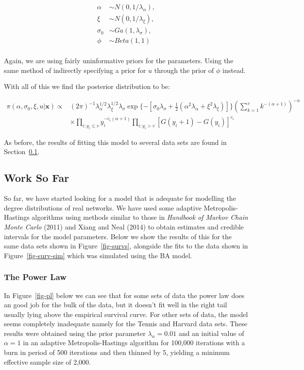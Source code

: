 \documentclass[
]{article}
\begin{document}
\begin{align*}
\alpha &\sim N(0,1/\lambda_\alpha),\\
\xi &\sim N(0,1/\lambda_\xi),\\
\sigma_0 &\sim Ga(1,\lambda_\sigma),\\
\phi &\sim Beta(1,1)\\
%
\end{align*}

Again, we are using fairly uninformative priors for the parameters.
Using the same method of indirectly specifying a prior for \(u\) through
the prior of \(\phi\) instead.

With all of this we find the posterior distribution to be:

\begin{align*}
\pi(\alpha,\sigma_0, \xi, u| \boldsymbol{x}) \propto & (2\pi)^{-1}\lambda_\alpha^{1/2}\lambda_\xi^{1/2}\lambda_\sigma\exp\{-[\sigma_0\lambda_\sigma + \frac{1}{2}(\alpha^2\lambda_\alpha + \xi^2\lambda_\xi)]\} \left(\sum_{k=1}^v k^{-(\alpha+1)}\right)^{-n}\\& \times \prod_{i:y_i\le v}y_i^{-c_i(\alpha+1)}\prod_{i:y_i>v}\left[G(y_i+1) - G(y_i)\right]^{c_i}
\end{align*}

As before, the results of fitting this model to several data sets are
found in Section~\ref{sec-wsf}.

\subsection{Work So Far}\label{sec-wsf}

So far, we have started looking for a model that is adequate for
modelling the degree distributions of real networks. We have used some
adaptive Metropolis-Hastings algorithms using methods similar to those
in \emph{Handbook of Markov Chain Monte Carlo} (2011) and Xiang and Neal
(2014) to obtain estimates and credible intervals for the model
parameters. Below we show the results of this for the same data sets
shown in Figure~\ref{fig-survs}, alongside the fits to the data shown in
Figure~\ref{fig-surv-sim} which was simulated using the BA model.

\subsubsection{The Power Law}\label{the-power-law}

In Figure~\ref{fig-pl} below we can see that for some sets of data the
power law does an good job for the bulk of the data, but it doesn't fit
well in the right tail usually lying above the empirical survival curve.
For other sets of data, the model seems completely inadequate namely for
the Tennis and Harvard data sets. These results were obtained using the
prior parameter \(\lambda_\alpha = 0.01\) and an initial value of
\(\alpha=1\) in an adaptive Metropolis-Hastings algorithm for 100,000
iterations with a burn in period of 500 iterations and then thinned by
5, yielding a minimum effective sample size of 2,000.
\end{document}
